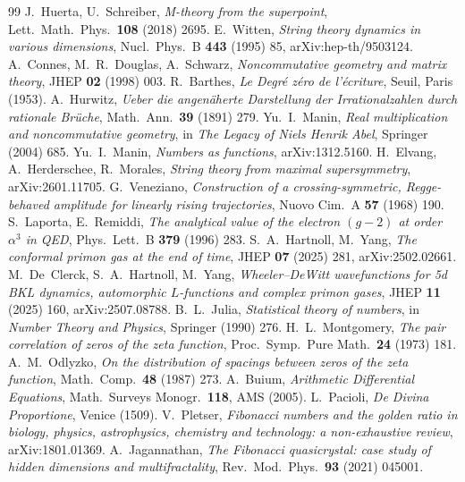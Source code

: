 \begin{thebibliography}{99}
 J.~Huerta, U.~Schreiber, \emph{M-theory from the superpoint}, Lett.\ Math.\ Phys.\ \textbf{108} (2018) 2695.
 E.~Witten, \emph{String theory dynamics in various dimensions}, Nucl.\ Phys.\ B \textbf{443} (1995) 85, arXiv:hep-th/9503124.
 A.~Connes, M.~R.~Douglas, A.~Schwarz, \emph{Noncommutative geometry and matrix theory}, JHEP \textbf{02} (1998) 003.
 R.~Barthes, \emph{Le Degr\'e z\'ero de l'\'ecriture}, Seuil, Paris (1953).
 A.~Hurwitz, \emph{Ueber die angen\"aherte Darstellung der Irrationalzahlen
durch rationale Br\"uche}, Math.\ Ann.\ \textbf{39} (1891) 279.
 Yu.~I.~Manin, \emph{Real multiplication and noncommutative geometry}, in \emph{The Legacy of Niels Henrik Abel}, Springer (2004) 685.
 Yu.~I.~Manin, \emph{Numbers as functions}, arXiv:1312.5160.
 H.~Elvang, A.~Herderschee, R.~Morales, \emph{String theory from maximal supersymmetry}, arXiv:2601.11705.
 G.~Veneziano, \emph{Construction of a crossing-symmetric, Regge-behaved amplitude for linearly rising trajectories}, Nuovo Cim.\ A \textbf{57} (1968) 190.
 S.~Laporta, E.~Remiddi, \emph{The analytical value of the electron $(g-2)$ at order $\alpha^3$ in QED}, Phys.\ Lett.\ B \textbf{379} (1996) 283.
 S.~A.~Hartnoll, M.~Yang, \emph{The conformal primon gas at the end of time}, JHEP \textbf{07} (2025) 281, arXiv:2502.02661.
 M.~De~Clerck, S.~A.~Hartnoll, M.~Yang, \emph{Wheeler--DeWitt wavefunctions for 5d BKL dynamics, automorphic $L$-functions and complex primon gases}, JHEP \textbf{11} (2025) 160, arXiv:2507.08788.
 B.~L.~Julia, \emph{Statistical theory of numbers}, in \emph{Number Theory and Physics}, Springer (1990) 276.
 H.~L.~Montgomery, \emph{The pair correlation of zeros of the zeta function}, Proc.\ Symp.\ Pure Math.\ \textbf{24} (1973) 181.
 A.~M.~Odlyzko, \emph{On the distribution of spacings between zeros of the zeta function}, Math.\ Comp.\ \textbf{48} (1987) 273.
 A.~Buium, \emph{Arithmetic Differential Equations}, Math.\ Surveys Monogr.\ \textbf{118}, AMS (2005).
 L.~Pacioli, \emph{De Divina Proportione}, Venice (1509).
 V.~Pletser, \emph{Fibonacci numbers and the golden ratio in biology, physics, astrophysics, chemistry and technology: a non-exhaustive review}, arXiv:1801.01369.
 A.~Jagannathan, \emph{The Fibonacci quasicrystal: case study of hidden dimensions and multifractality}, Rev.\ Mod.\ Phys.\ \textbf{93} (2021) 045001.

\end{thebibliography}

